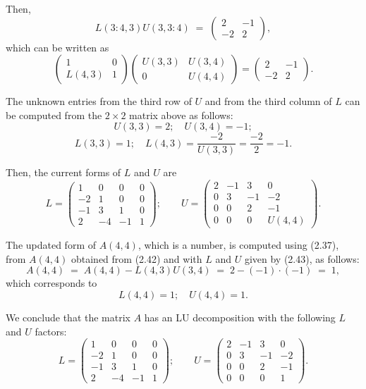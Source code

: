 \begin{examplex}
Then,
\[
L(3:4,3)U(3,3:4) \;=\; \begin{pmatrix} 2 & -1 \\ -2 & 2 \end{pmatrix},
\]
which can be written as
\[
\begin{pmatrix} 1 & 0 \\ L(4,3) & 1 \end{pmatrix}
\begin{pmatrix} U(3,3) & U(3,4) \\ 0 & U(4,4) \end{pmatrix}
=
\begin{pmatrix} 2 & -1 \\ -2 & 2 \end{pmatrix}.
\]

The unknown entries from the third row of $U$ and from the third column of
$L$ can be computed from the $2\times 2$ matrix above as follows:
\[
U(3,3)=2; \quad U(3,4)=-1;
\]
\[
L(3,3)=1; \quad L(4,3)=\frac{-2}{U(3,3)}=\frac{-2}{2}=-1.
\]

Then, the current forms of $L$ and $U$ are
\begin{equation}
L=\begin{pmatrix} 1 & 0 & 0 & 0 \\ -2 & 1 & 0 & 0 \\ -1 & 3 & 1 & 0 \\ 2 & -4 & -1 & 1 \end{pmatrix};
\qquad
U=\begin{pmatrix} 2 & -1 & 3 & 0 \\ 0 & 3 & -1 & -2 \\ 0 & 0 & 2 & -1 \\ 0 & 0 & 0 & U(4,4) \end{pmatrix}.
\end{equation}

The updated form of $A(4,4)$, which is a number, is computed using (2.37),
from $A(4,4)$ obtained from (2.42) and with $L$ and $U$ given by (2.43), as
follows:
\[
A(4,4) \;=\; A(4,4) - L(4,3)U(3,4) \;=\; 2-(-1)\cdot(-1) \;=\; 1,
\]
which corresponds to
\[
L(4,4)=1; \quad U(4,4)=1.
\]

We conclude that the matrix $A$ has an LU decomposition with the following
$L$ and $U$ factors:
\[
L=\begin{pmatrix} 1 & 0 & 0 & 0 \\ -2 & 1 & 0 & 0 \\ -1 & 3 & 1 & 0 \\ 2 & -4 & -1 & 1 \end{pmatrix};
\qquad
U=\begin{pmatrix} 2 & -1 & 3 & 0 \\ 0 & 3 & -1 & -2 \\ 0 & 0 & 2 & -1 \\ 0 & 0 & 0 & 1 \end{pmatrix}.
\]
\end{examplex}

